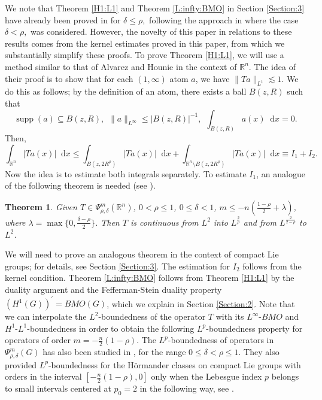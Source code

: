 \documentclass[12pt, reqno]{amsart}
\newtheorem{theorem}{Theorem}[section]
\theoremstyle{definition}
\theoremstyle{remark}
\numberwithin{equation}{section}
\newcommand*\diff{\mathop{}\!\mathrm{d}}
\begin{document}
 We note that Theorem \ref{H1:L1} and Theorem \ref{L:infty:BMO} in Section \ref{Section:3} have already been proved in \cite{CR} for $\delta\leq \rho,$ following the approach in \cite{9} where the case $\delta< \rho,$ was considered. However, the novelty of this paper in relations to these results comes from the kernel estimates proved in this paper, from which we substantially simplify these proofs. To prove Theorem \ref{H1:L1}, we will use a method similar to that of Alvarez and Hounie \cite[Theorem 3.2]{1} in the context of $\mathbb{R}^n$. The idea of their proof is to show that for each $(1,\infty)$ atom $a$, we have $\|Ta\|_{L^1}\lesssim 1$. We do this as follows; by the definition of an atom, there exists a ball $B(z,R)$ such that
  \begin{equation*}
        \operatorname{supp}(a)\subseteq B(z,R),\hspace{5pt}\|a\|_{L^\infty}\leq|B(z,R)|^{-1},\hspace{5pt}\int_{B(z,R)}a(x)\diff{x}=0.
 \end{equation*}
Then,
\begin{equation*}
\int_{\mathbb{R}^n}|Ta(x)|\diff{x}\leq\int_{B(z,2R^\rho)}|Ta(x)|\diff{x}+\int_{\mathbb{R}^n\setminus B(z,2R^\rho)}|Ta(x)|\diff{x}\equiv I_1+I_2.
    \end{equation*} 
Now the idea is to estimate both integrals separately. To estimate $I_1$, an analogue of the following theorem is needed (see  \cite[Theorem 3.1]{1}).
\begin{theorem}
    Given $T\in\Psi^{m}_{\rho,\delta}(\mathbb{R}^n)$, $0<\rho\leq 1$, $0\leq\delta<1$, $m\leq-n\left(\frac{1-\rho}{2}+\lambda\right)$, where $\lambda=\max\{0,\frac{\delta-\rho}{2}\}$. Then $T$ is continuous from $L^2$ into $L^\frac{2}{\rho}$ and from $L^{\frac{2}{2-\rho}}$ to $L^2$.  
\end{theorem}
We will need to prove an analogous theorem in the context of compact Lie groups; for details, see Section \ref{Section:3}. The estimation for $I_2$ follows from the kernel condition. Theorem \ref{L:infty:BMO} follows from Theorem \ref{H1:L1} by the duality argument and the Fefferman-Stein duality property $(H^1(G))^{'}=BMO(G)$, which we explain in Section \ref{Section:2}. Note that we can interpolate the $L^2$-boundedness of the operator $T$ with its $L^\infty$-$BMO$ and $H^1$-$L^1$-boundedness in order to obtain the following $L^p$-boundedness property for operators of order $m=-\frac{n}{2}(1-\rho).$ The $L^{p}$-boundedness of operators in $\Psi_{\rho,\delta}^{m}(G)$ has also been
studied in \cite{9}, for the range $0 \leq \delta < \rho \leq 1$. They also provided $L^p$-boundedness for the H\"ormander classes on compact Lie groups with orders in the interval $[-\frac{n}{2}(1-\rho),0]$ only when the Lebesgue index $p$ belongs to small intervals centered at $p_0=2$  in the following way,  see \cite[Theorem 4.15]{9}. 
\end{document}
